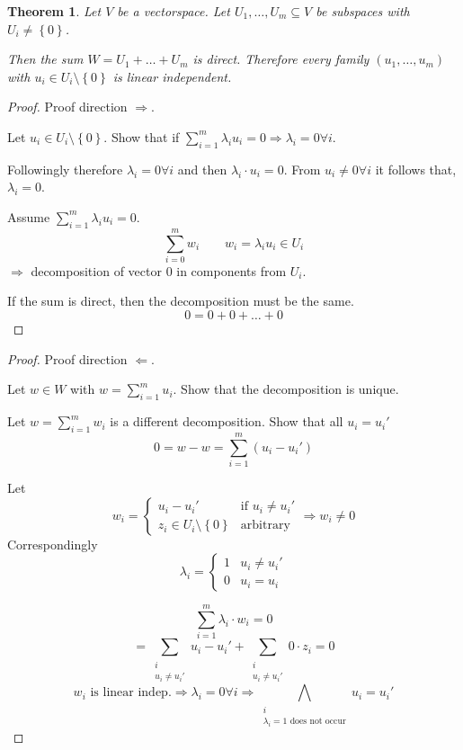 \documentclass[a4paper,landscape,twocolumn]{article}
\newcommand\set[1]{\left\{#1\right\}}
\newtheorem{theorem}{Theorem}
\begin{document}
\begin{theorem}
  \label{satz-4-14}
  Let $V$ be a vectorspace. Let $U_1, \dots, U_m \subseteq V$ be subspaces
  with $U_i \neq \set{0}$.

  Then the sum $W = U_1 + \dots + U_m$ is direct.
  Therefore every family $(u_1, \dots, u_m)$ with $u_i \in U_i \setminus \set{0}$ is linear independent.
\end{theorem}
\begin{proof}
  Proof direction $\Rightarrow$.

  Let $u_i \in U_i \setminus \set{0}$.
  Show that if $\sum_{i=1}^m \lambda_i u_i = 0 \Rightarrow \lambda_i = 0 \forall i$.

  Followingly therefore $\lambda_i = 0 \forall i$ and then $\lambda_i \cdot u_i = 0$.
  From $u_i \neq 0 \forall i$ it follows that, $\lambda_i = 0$.

  Assume $\sum_{i=1}^m \lambda_i u_i = 0$.
  \[ \sum_{i=0}^m w_i \qquad w_i = \lambda_i u_i \in U_i \]
  $\Rightarrow$ decomposition of vector $0$ in components from $U_i$.

  If the sum is direct, then the decomposition must be the same.
  \[ 0 = 0 + 0 + \dots + 0 \]
\end{proof}
\begin{proof}
  Proof direction $\Leftarrow$.

  Let $w \in W$ with $w = \sum_{i = 1}^m u_i$.
  Show that the decomposition is unique.

  Let $w = \sum_{i=1}^m w_i$ is a different decomposition.
  Show that all $u_i = u_i'$
  \[ 0 = w - w = \sum_{i=1}^m (u_i - u_i') \]

  Let
  \[
    w_i = \begin{cases}
      u_i - u_i' & \text{if } u_i \neq u_i' \\
      z_i \in U_i \setminus \set{0} & \text{arbitrary}
    \end{cases}
    \Rightarrow w_i \neq 0
  \]
  Correspondingly
  \[
    \lambda_i = \begin{cases}
      1 & u_i \neq u_i' \\
      0 & u_i = u_i
    \end{cases}
  \]

  \[ \sum_{i=1}^m \lambda_i \cdot w_i = 0 \]
  \[ = \sum_{\substack{i \\ u_i \neq u_i'}} u_i - u_i' + \sum_{\substack{i \\ u_i \neq u_i'}} 0 \cdot z_i = 0 \]
  \[ w_i \text{ is linear indep.} \Rightarrow \lambda_i = 0 \forall i \Rightarrow \bigwedge_{\substack{i \\ \lambda_i = 1 \text{ does not occur}}} u_i = u_i' \]
\end{proof}
\end{document}
